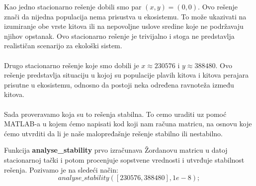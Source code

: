 \documentclass[a4paper]{article}
\begin{document}
{	Kao jedno stacionarno rešenje dobili smo par $ (x, y) = (0, 0)$. Ovo rešenje znači da nijedna populacija nema prisustva u ekosistemu. To može ukazivati na izumiranje obe vrste kitova ili na nepovoljne uslove sredine koje ne podržavaju njihov opstanak. Ovo stacionarno rešenje je trivijalno i stoga ne predstavlja realističan scenarijo za ekološki sistem.\\
	\\
	Drugo stacionarno rešenje koje smo dobili je $ x \approx 230576$ i $ y \approx 388480$. Ovo rešenje predstavlja situaciju u kojoj su populacije plavih kitova i kitova perajara prisutne u ekosistemu, odnosno da postoji neka određena ravnoteža između kitova.\\
	\\
	Sada proveravamo koja su to rešenja stabilna. To cemo uraditi uz pomoć MATLAB-a u kojem ćemo napisati kod koji nam računa matricu, na osnovu koje ćemo utvrditi da li je naše malopređašnje rešenje stabilno ili nestabilno.
	

	
	Funkcija \textbf{analyse\_stability} prvo izračunava Žordanovu matricu u datoj stacionarnoj tački i potom procenjuje sopstvene vrednosti i utvrđuje stabilnost rešenja. Pozivamo je na sledeći način:\\ 
	
	\[
		analyse\_stability([230576, 388480], 1e-8);
	\]
	
}
\end{document}
